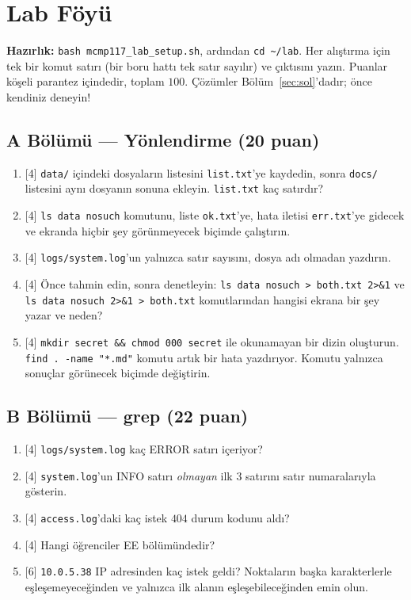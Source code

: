 \documentclass[11pt,a4paper]{article}
\newcommand{\cmd}[1]{\texttt{#1}}
\begin{document}
\section{Lab Föyü}
\label{sec:lab}

\textbf{Hazırlık:} \cmd{bash mcmp117\_lab\_setup.sh}, ardından \cmd{cd \textasciitilde/lab}. Her alıştırma için tek bir komut satırı (bir boru hattı tek satır sayılır) ve çıktısını yazın. Puanlar köşeli parantez içindedir, toplam $100$. Çözümler Bölüm~\ref{sec:sol}'dadır; önce kendiniz deneyin!

\subsection*{A Bölümü --- Yönlendirme (20 puan)}
\begin{enumerate}[leftmargin=2.2em,label=\textbf{A\arabic*}]
  \item {[4]} \texttt{data/} içindeki dosyaların listesini \texttt{list.txt}'ye kaydedin, sonra \texttt{docs/} listesini aynı dosyanın sonuna ekleyin. \texttt{list.txt} kaç satırdır?
  \item {[4]} \cmd{ls data nosuch} komutunu, liste \texttt{ok.txt}'ye, hata iletisi \texttt{err.txt}'ye gidecek ve ekranda hiçbir şey görünmeyecek biçimde çalıştırın.
  \item {[4]} \texttt{logs/system.log}'un yalnızca satır sayısını, dosya adı olmadan yazdırın.
  \item {[4]} Önce tahmin edin, sonra denetleyin: \cmd{ls data nosuch > both.txt 2>\&1} ve \cmd{ls data nosuch 2>\&1 > both.txt} komutlarından hangisi ekrana bir şey yazar ve neden?
  \item {[4]} \cmd{mkdir secret \&\& chmod 000 secret} ile okunamayan bir dizin oluşturun. \cmd{find . -name "*.md"} komutu artık bir hata yazdırıyor. Komutu yalnızca sonuçlar görünecek biçimde değiştirin.
\end{enumerate}

\subsection*{B Bölümü --- grep (22 puan)}
\begin{enumerate}[leftmargin=2.2em,label=\textbf{B\arabic*}]
  \item {[4]} \texttt{logs/system.log} kaç ERROR satırı içeriyor?
  \item {[4]} \texttt{system.log}'un INFO satırı \emph{olmayan} ilk $3$ satırını satır numaralarıyla gösterin.
  \item {[4]} \texttt{access.log}'daki kaç istek $404$ durum kodunu aldı?
  \item {[4]} Hangi öğrenciler EE bölümündedir?
  \item {[6]} \texttt{10.0.5.38} IP adresinden kaç istek geldi? Noktaların başka karakterlerle eşleşemeyeceğinden ve yalnızca ilk alanın eşleşebileceğinden emin olun.
\end{enumerate}
\end{document}
